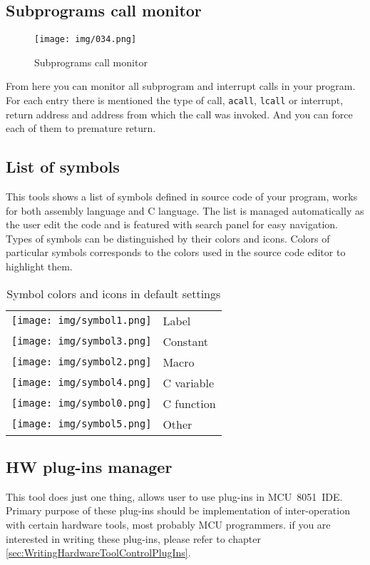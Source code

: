 \documentclass[a4paper,twoside,12pt]{book}
\newcommand{\mysmallfont}{\fontsize{8pt}{10pt} \selectfont{}}
\begin{document}
		\subsection{Subprograms call monitor}
			\begin{wrapfigure}{r}{130pt}
				\centering{}
				\texttt{[image: img/034.png]}
				\caption{Subprograms call monitor}
			\end{wrapfigure}
			From here you can monitor all subprogram and interrupt calls in your program. For each entry there is mentioned the type of call, \texttt{acall}, \texttt{lcall} or interrupt, return address and address from which the call was invoked. And you can force each of them to premature return.

		\subsection{List of symbols}
			This tools shows a list of symbols defined in source code of your program, works for both assembly language and C language. The list is managed automatically as the user edit the code and is featured with search panel for easy navigation. Types of symbols can be distinguished by their colors and icons. Colors of particular symbols corresponds to the colors used in the source code editor to highlight them.
			\begin{table}[h]
				\mysmallfont{}
				\centering{}
				\begin{tabular}{ll}
					\texttt{[image: img/symbol1.png]} & {\color{highlight_label} Label}		\\
					\texttt{[image: img/symbol3.png]} & {\color{highlight_constant} Constant}	\\
					\texttt{[image: img/symbol2.png]} & {\color{highlight_macro} Macro}		\\
					\texttt{[image: img/symbol4.png]} & {\color{black} C variable}		\\
					\texttt{[image: img/symbol0.png]} & {\color{blue} C function}		\\
					\texttt{[image: img/symbol5.png]} & {\color{black} Other}			\\
				\end{tabular}
				\caption{Symbol colors and icons in default settings}
			\end{table}


		\subsection{HW plug-ins manager}
			This tool does just one thing, allows user to use plug-ins in MCU~8051~IDE. Primary purpose of these plug-ins should be implementation of inter-operation with certain hardware tools, most probably MCU programmers. if you are interested in writing these plug-ins, please refer to chapter \ref{sec:WritingHardwareToolControlPlugIns}.
\end{document}
